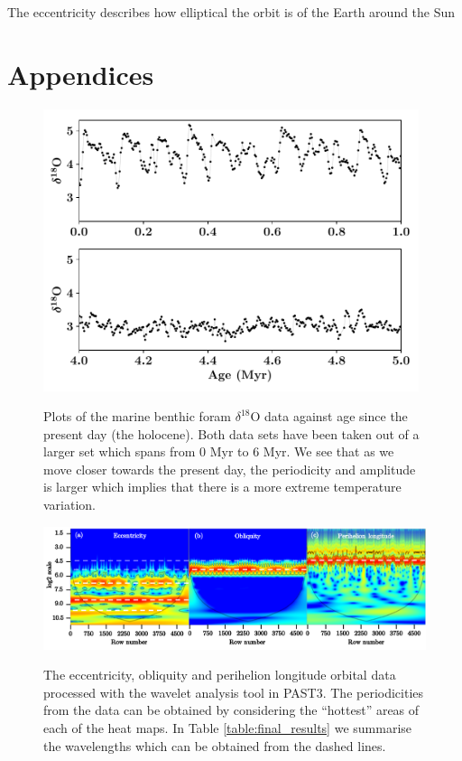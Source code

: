 \documentclass[12pt, onecolumn]{revtex4}    %
\begin{document}
The eccentricity describes how elliptical the orbit is of the Earth around the Sun\cite{carroll_astro} 

\newpage





\newpage

\section*{Appendices}
\begin{figure}[!h]
\begin{center}
\includegraphics[width=11cm]{figures/foram_data}
\caption[]{Plots of the marine benthic foram $\delta^{18}$O data against age since the present day (the holocene). Both data sets have been taken out of a larger set which spans from 0 Myr to 6 Myr. We see that as we move closer towards the present day, the periodicity and amplitude is larger which implies that there is a more extreme temperature variation.}
\vspace{-3ex}
\label{fig:foram_data}
\end{center}
\end{figure}

\begin{figure}[!h]
\begin{center}
\includegraphics[width=16cm]{figures/wa_orbital_data}
\caption[]{The eccentricity, obliquity and perihelion longitude orbital data processed with the wavelet analysis tool in PAST3. The periodicities from the data can be obtained by considering the ``hottest'' areas of each of the heat maps. In Table \ref{table:final_results} we summarise the wavelengths which can be obtained from the dashed lines.}
\vspace{-3ex}
\label{fig:wa_orbital_data}
\end{center}
\end{figure}
\end{document}
